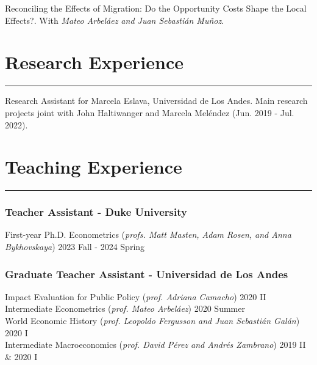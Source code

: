 \documentclass[12pt, letterpaper]{article}
\begin{document}
\noindent Reconciling the Effects of Migration: Do the Opportunity Costs Shape the Local Effects?. With \textit{Mateo Arbeláez and Juan Sebastián Muñoz}. \\ [-3mm]




\vspace{-6mm}

\section*{Research Experience}
\vspace*{-8mm}
\noindent \rule{\linewidth}{0.2mm}
\noindent
Research Assistant for Marcela Eslava, Universidad de Los Andes. Main research projects joint with John Haltiwanger and Marcela Meléndez (Jun. 2019 - Jul. 2022).  \\ 

\vspace{-6mm}


\section*{Teaching Experience}
\vspace*{-8mm}
\noindent \rule{\linewidth}{0.2mm}
\vspace*{-10mm}
\subsubsection*{Teacher Assistant - Duke University}
\vspace*{-1mm}
\noindent 
First-year Ph.D. Econometrics \hspace{5mm}  (\textit{profs. Matt Masten, Adam Rosen, and Anna Bykhovskaya}) \hfill 2023 Fall - 2024 Spring \\
\vspace*{-7mm}
\subsubsection*{Graduate Teacher Assistant - Universidad de Los Andes}
\vspace*{-1mm}
\noindent
Impact Evaluation for Public Policy  \hspace{5mm} (\textit{prof. Adriana Camacho}) \hfill 2020 II \\
Intermediate Econometrics  \hspace{5mm} (\textit{prof. Mateo Arbeláez}) \hfill 2020 Summer \\
World Economic History  \hspace{5mm} (\small{\textit{prof. Leopoldo Fergusson and Juan Sebastián Galán}})  \hfill  2020 I  \\
Intermediate Macroeconomics \hspace{5mm}  (\textit{prof. David Pérez and Andrés Zambrano}) \hfill 2019 II \& 2020 I \\
\end{document}
